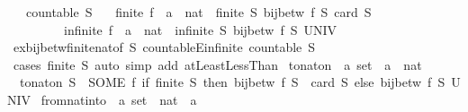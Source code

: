 \begin{isabellebody}
\ \ \ {\isachardoublequoteopen}countable\ S{\isachardoublequoteclose}\isanewline
\ \ \ {\isacharparenleft}finite{\isacharparenright}\ f\ {\isacharcolon}{\isacharcolon}\ {\isachardoublequoteopen}{\isacharprime}a\ {\isasymRightarrow}\ nat{\isachardoublequoteclose}\ \ {\isachardoublequoteopen}finite\ S{\isachardoublequoteclose}\ {\isachardoublequoteopen}bij{\isacharunderscore}betw\ f\ S\ {\isacharbraceleft}{\isachardot}{\isachardot}{\isacharless}card\ S{\isacharbraceright}{\isachardoublequoteclose}\isanewline
\ \ \ \ \ \ \ \ {\isacharbar}\ {\isacharparenleft}infinite{\isacharparenright}\ f\ {\isacharcolon}{\isacharcolon}\ {\isachardoublequoteopen}{\isacharprime}a\ {\isasymRightarrow}\ nat{\isachardoublequoteclose}\ \ {\isachardoublequoteopen}infinite\ S{\isachardoublequoteclose}\ {\isachardoublequoteopen}bij{\isacharunderscore}betw\ f\ S\ UNIV{\isachardoublequoteclose}\isanewline
%
\isadelimproof
\ \ %
\endisadelimproof
%
\isatagproof
{}\isamarkupfalse%
\ ex{\isacharunderscore}bij{\isacharunderscore}betw{\isacharunderscore}finite{\isacharunderscore}nat{\isacharbrackleft}of\ S{\isacharbrackright}\ countableE{\isacharunderscore}infinite\ {\isacartoucheopen}countable\ S{\isacartoucheclose}\isanewline
\ \ \isamarkupfalse%
\ {\isacharparenleft}cases\ {\isachardoublequoteopen}finite\ S{\isachardoublequoteclose}{\isacharparenright}\ {\isacharparenleft}auto\ simp\ add{\isacharcolon}\ atLeast{}LessThan{\isacharparenright}%
\endisatagproof
{\isafoldproof}%
%
\isadelimproof
\isanewline
%
\endisadelimproof
\isanewline
{}\isamarkupfalse%
\ to{\isacharunderscore}nat{\isacharunderscore}on\ {\isacharcolon}{\isacharcolon}\ {\isachardoublequoteopen}{\isacharprime}a\ set\ {\isasymRightarrow}\ {\isacharprime}a\ {\isasymRightarrow}\ nat{\isachardoublequoteclose}\ \isanewline
\ \ {\isachardoublequoteopen}to{\isacharunderscore}nat{\isacharunderscore}on\ S\ {\isacharequal}\ {\isacharparenleft}SOME\ f{\isachardot}\ if\ finite\ S\ then\ bij{\isacharunderscore}betw\ f\ S\ {\isacharbraceleft}{\isachardot}{\isachardot}{\isacharless}\ card\ S{\isacharbraceright}\ else\ bij{\isacharunderscore}betw\ f\ S\ UNIV{\isacharparenright}{\isachardoublequoteclose}\isanewline
\isanewline
{}\isamarkupfalse%
\ from{\isacharunderscore}nat{\isacharunderscore}into\ {\isacharcolon}{\isacharcolon}\ {\isachardoublequoteopen}{\isacharprime}a\ set\ {\isasymRightarrow}\ nat\ {\isasymRightarrow}\ {\isacharprime}a{\isachardoublequoteclose}\ \isanewline

\end{isabellebody}
